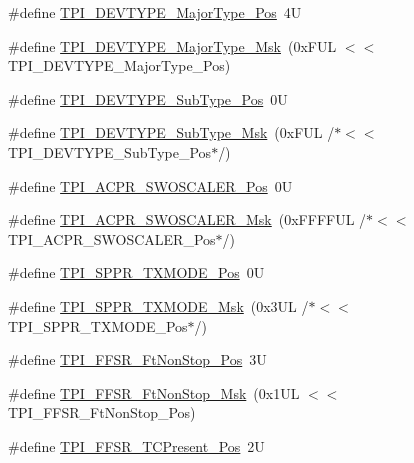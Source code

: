 \begin{DoxyCompactItemize}
\item 
\#define \mbox{\hyperlink{group___c_m_s_i_s___t_p_i_ga69c4892d332755a9f64c1680497cebdd}{T\+P\+I\+\_\+\+D\+E\+V\+T\+Y\+P\+E\+\_\+\+Major\+Type\+\_\+\+Pos}}~4U
\item 
\#define \mbox{\hyperlink{group___c_m_s_i_s___t_p_i_gaecbceed6d08ec586403b37ad47b38c88}{T\+P\+I\+\_\+\+D\+E\+V\+T\+Y\+P\+E\+\_\+\+Major\+Type\+\_\+\+Msk}}~(0x\+F\+U\+L $<$$<$ T\+P\+I\+\_\+\+D\+E\+V\+T\+Y\+P\+E\+\_\+\+Major\+Type\+\_\+\+Pos)
\item 
\#define \mbox{\hyperlink{group___c_m_s_i_s___t_p_i_ga0c799ff892af5eb3162d152abc00af7a}{T\+P\+I\+\_\+\+D\+E\+V\+T\+Y\+P\+E\+\_\+\+Sub\+Type\+\_\+\+Pos}}~0U
\item 
\#define \mbox{\hyperlink{group___c_m_s_i_s___t_p_i_ga5b2fd7dddaf5f64855d9c0696acd65c1}{T\+P\+I\+\_\+\+D\+E\+V\+T\+Y\+P\+E\+\_\+\+Sub\+Type\+\_\+\+Msk}}~(0x\+F\+U\+L /$\ast$$<$$<$ T\+P\+I\+\_\+\+D\+E\+V\+T\+Y\+P\+E\+\_\+\+Sub\+Type\+\_\+\+Pos$\ast$/)
\item 
\#define \mbox{\hyperlink{group___c_m_s_i_s___t_p_i_ga73adc86f1ee60e5b75d963361535ed24}{T\+P\+I\+\_\+\+A\+C\+P\+R\+\_\+\+S\+W\+O\+S\+C\+A\+L\+E\+R\+\_\+\+Pos}}~0U
\item 
\#define \mbox{\hyperlink{group___c_m_s_i_s___t_p_i_ga73da1dbfb935b27bfd5473d3b041fdb5}{T\+P\+I\+\_\+\+A\+C\+P\+R\+\_\+\+S\+W\+O\+S\+C\+A\+L\+E\+R\+\_\+\+Msk}}~(0x\+F\+F\+F\+F\+U\+L /$\ast$$<$$<$ T\+P\+I\+\_\+\+A\+C\+P\+R\+\_\+\+S\+W\+O\+S\+C\+A\+L\+E\+R\+\_\+\+Pos$\ast$/)
\item 
\#define \mbox{\hyperlink{group___c_m_s_i_s___t_p_i_ga0f302797b94bb2da24052082ab630858}{T\+P\+I\+\_\+\+S\+P\+P\+R\+\_\+\+T\+X\+M\+O\+D\+E\+\_\+\+Pos}}~0U
\item 
\#define \mbox{\hyperlink{group___c_m_s_i_s___t_p_i_gaca085c8a954393d70dbd7240bb02cc1f}{T\+P\+I\+\_\+\+S\+P\+P\+R\+\_\+\+T\+X\+M\+O\+D\+E\+\_\+\+Msk}}~(0x3\+U\+L /$\ast$$<$$<$ T\+P\+I\+\_\+\+S\+P\+P\+R\+\_\+\+T\+X\+M\+O\+D\+E\+\_\+\+Pos$\ast$/)
\item 
\#define \mbox{\hyperlink{group___c_m_s_i_s___t_p_i_ga9537b8a660cc8803f57cbbee320b2fc8}{T\+P\+I\+\_\+\+F\+F\+S\+R\+\_\+\+Ft\+Non\+Stop\+\_\+\+Pos}}~3U
\item 
\#define \mbox{\hyperlink{group___c_m_s_i_s___t_p_i_gaaa313f980974a8cfc7dac68c4d805ab1}{T\+P\+I\+\_\+\+F\+F\+S\+R\+\_\+\+Ft\+Non\+Stop\+\_\+\+Msk}}~(0x1\+U\+L $<$$<$ T\+P\+I\+\_\+\+F\+F\+S\+R\+\_\+\+Ft\+Non\+Stop\+\_\+\+Pos)
\item 
\#define \mbox{\hyperlink{group___c_m_s_i_s___t_p_i_gad30fde0c058da2ffb2b0a213be7a1b5c}{T\+P\+I\+\_\+\+F\+F\+S\+R\+\_\+\+T\+C\+Present\+\_\+\+Pos}}~2U

\end{DoxyCompactItemize}
